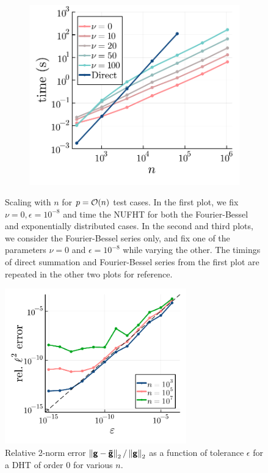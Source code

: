 \begin{figure}
\begin{subfigure}[b]{0.32\textwidth}
  \end{subfigure} 
  \begin{subfigure}[b]{0.32\textwidth}
    \includegraphics[height=0.92\textwidth, trim={1.3cm 0 0.4cm 0}, clip]{./figures/nu_scaling.pdf}
  \end{subfigure}
  \caption{Scaling with $n$ for $p = \bO(n)$ test cases. In the first plot, we
  fix $\nu = 0, \epsilon = 10^{-8}$ and time the NUFHT for both the
  Fourier-Bessel and exponentially distributed cases. In the second and third
  plots, we consider the Fourier-Bessel series only, and fix one of the
  parameters $\nu = 0$ and $\epsilon = 10^{-8}$ while varying the other. The
  timings of direct summation and Fourier-Bessel series from the first plot are
  repeated in the other two plots for reference.}
  \label{fig:both-scaling}
\end{figure}

\begin{figure}[t]
  \centering
  \includegraphics[width=0.7\textwidth]{./figures/accuracy.pdf}
  \caption{Relative 2-norm error $\norm[2]{\vct{g} - \vct{\tilde{g}}} /
  \norm[2]{\vct{g}}$ as a function of tolerance $\epsilon$ for a DHT of order
  $0$ for various $n$.}
  \label{fig:accuracy}
\end{figure}

